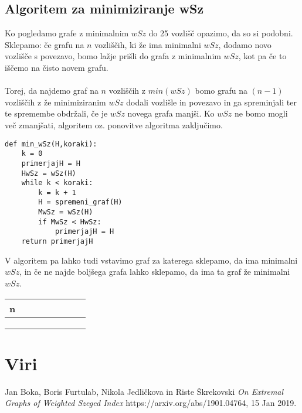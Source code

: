 \documentclass[12pt, a4paper]{article}
\begin{document}
\newpage

\subsection[Algoritem za minimiziranje wSz]{Algoritem za minimiziranje wSz}

Ko pogledamo grafe z minimalnim $wSz$ do 25 vozlišč opazimo, da so si podobni. Sklepamo: če grafu na $n$ vozliščih, ki že ima minimalni $wSz$, dodamo novo vozlišče s povezavo, bomo lažje prišli do grafa z minimalnim $wSz$, kot pa če to iščemo na čisto novem grafu.\\
\\
Torej, da najdemo graf na $n$ vozliščih z $min(wSz)$ bomo grafu na $(n-1)$ vozliščih z že minimiziranim $wSz$ dodali vozlišle in povezavo in ga spreminjali ter te spremembe obdržali, če je $wSz$ novega grafa manjši. Ko $wSz$ ne bomo mogli več zmanjšati, algoritem oz. ponovitve algoritma zaključimo.

\begin{verbatim}
def min_wSz(H,koraki):
    k = 0
    primerjajH = H
    HwSz = wSz(H)
    while k < koraki:
        k = k + 1
        H = spremeni_graf(H)
        MwSz = wSz(H)
        if MwSz < HwSz:
            primerjajH = H
    return primerjajH
\end{verbatim}

V algoritem pa lahko tudi vstavimo graf za katerega sklepamo, da ima minimalni $wSz$, in če ne najde boljšega grafa lahko sklepamo, da ima ta graf že minimalni $wSz$.

\newpage
\begin{table}[!h]
\begin{tabular}{|c|c|c|c|c|c|c|c|}
\hline
n&&&&&&&\\\hline
&&&&&&&\\\hline
&&&&&&&\\\hline
&&&&&&&\\\hline
\end{tabular}
\end{table}


\newpage
\section[Viri]{Viri}

\begin{thebibliography}{9}
Jan Boka, Boris Furtulab, Nikola Jedličkova in Riste Škrekovski
\textit{On Extremal Graphs of Weighted Szeged Index} 
https://arxiv.org/abs/1901.04764, 15 Jan 2019.
 

\end{thebibliography}
\end{document}
